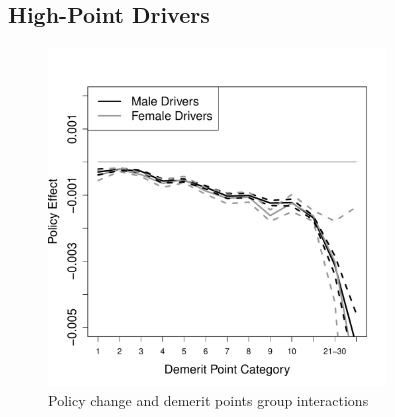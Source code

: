 \documentclass[12pt]{paper}
\begin{document}
\clearpage
\pagebreak
\subsection*{High-Point Drivers}











\begin{figure}
\centering
\includegraphics[width=0.8\textwidth]{../Figures/FFX_reg_policy_points_grp_high_pts.pdf}
\caption{Policy change and demerit points group interactions}
% 
\label{fig:FE-regs}
\end{figure}
\end{document}
